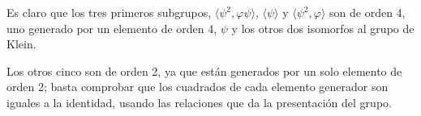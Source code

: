 \documentclass[a4paper, 11pt]{article}
\begin{document}
\begin{solucion}
\begin{apartado}

      \end{apartado}

      \begin{apartado}
          Es claro que los tres primeros subgrupos, $\langle\psi^2,\varphi\psi\rangle$, $\langle\psi\rangle$ y $\langle\psi^2,\varphi\rangle$ son de orden 4, uno generado por un elemento de orden 4, $\psi$ y los otros dos isomorfos al grupo de Klein.

          Los otros cinco son de orden 2, ya que están generados por un solo elemento de orden 2; basta comprobar que los cuadrados de cada elemento generador son iguales a la identidad, usando las relaciones que da la presentación del grupo.
      \end{apartado}
  \end{solucion}

  \begin{ejercicio}
  \end{ejercicio}
\end{document}

